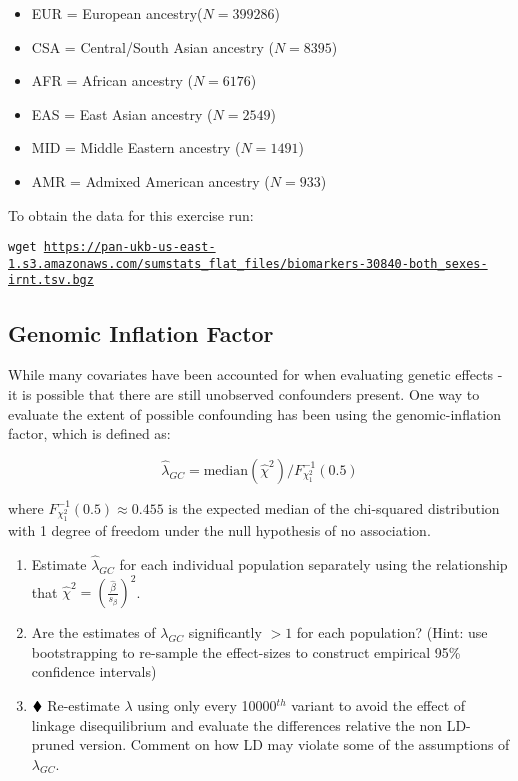 \documentclass{pset}
\begin{document}
\begin{itemize}
	\setlength{\itemsep}{0pt}
	\item EUR = European ancestry($N=399286$)
	\item CSA = Central/South Asian ancestry ($N=8395$)
	\item AFR = African ancestry ($N=6176$)
	\item EAS = East Asian ancestry ($N=2549$)
	\item MID = Middle Eastern ancestry ($N=1491$)
	\item AMR = Admixed American ancestry ($N=933$)
\end{itemize}

To obtain the data for this exercise run: 

\begin{center}
\texttt{wget \url{https://pan-ukb-us-east-1.s3.amazonaws.com/sumstats_flat_files/biomarkers-30840-both_sexes-irnt.tsv.bgz}}
\end{center}

\subsection*{Genomic Inflation Factor}

While many covariates have been accounted for when evaluating genetic effects - it is possible that there are still unobserved confounders present. One way to  evaluate the extent of possible confounding has been using the genomic-inflation factor, which is defined as: 

$$\hat{\lambda}_{GC} = \text{median}(\hat{\chi}^2) / F^{-1}_{\chi^2_1}(0.5)$$  

where $F^{-1}_{\chi^2_1}(0.5) \approx 0.455$ is the expected median of the chi-squared distribution with 1 degree of freedom under the null hypothesis of no association. 

\begin{enumerate}
\item Estimate $\hat{\lambda}_{GC}$ for each individual population separately using the relationship that $\hat{\chi}^2 = \left(\frac{\hat{\beta}}{s_\beta}\right)^2$. 
\item Are the estimates of $\lambda_{GC}$ significantly $> 1$ for each population? (Hint: use bootstrapping to re-sample the effect-sizes to construct empirical 95\% confidence intervals)
\item $\mathbin{\blacklozenge}$ Re-estimate $\lambda$ using only every 10000$^{th}$ variant to avoid the effect of linkage disequilibrium and evaluate the differences relative the non LD-pruned version. Comment on how LD may violate some of the assumptions of $\lambda_{GC}$.
\end{enumerate} 
\end{document}
